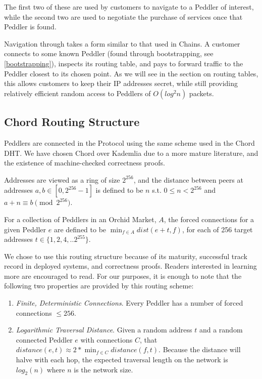 The first two of these are used by customers to navigate to a Peddler
of interest, while the second two are used to negotiate the purchase
of services once that Peddler is found.

Navigation through \tOM{} takes a form similar to that used in
Chains. A customer connects to some known Peddler (found through
bootstrapping, see \ref{bootstrapping}), inspects its routing table,
and pays to forward traffic to the Peddler closest to its chosen
point. As we will see in the section on routing tables, this allows
customers to keep their IP addresses secret, while still providing
relatively efficient random access to Peddlers of $O(log^2 n)$ packets.

\subsection{Chord Routing Structure}


Peddlers are connected in the \Orchid{} Protocol using the same scheme
used in the Chord DHT. We have chosen Chord over Kademlia due to a
more mature literature, and the existence of machine-checked
correctness proofs\cite{ChordCorrect}.

Addresses are viewed as a ring of size $2^{256}$, and the distance
between peers at addresses $a, b \in [0, 2^{256}-1]$ is defined to be
$n$ s.t. $0 \leq n < 2^{256}$ and $a + n \equiv b \pmod{2^{256}}$.

For a collection of Peddlers in an Orchid Market, $A$, the forced
connections for a given Peddler $e$ are defined to be $\min_{f \in A}
dist(e+t, f)$, for each of 256 target addresses $t \in \{1, 2, 4,
.. 2^{255}\}$.

We chose to use this routing structure because of its maturity,
successful track record in deployed systems, and correctness
proofs. Readers interested in learning more are encouraged to
read\cite{CHORD}. For our purposes, it is enough to note that the
following two properties are provided by this routing scheme:

\begin{enumerate}
\item \emph{Finite, Deterministic Connections}. Every Peddler has a
  number of forced connections $\leq 256$.
\item \emph{Logarithmic Traversal Distance}. Given a random address
  $t$ and a random connected Peddler $e$ with connections $C$, that
  $distance(e, t) \approx 2 * \min_{f \in C} distance(f, t)$. Because
  the distance will halve with each hop, the expected traversal length
  on the network is $log_2(n)$ where $n$ is the network size.
\end{enumerate}

